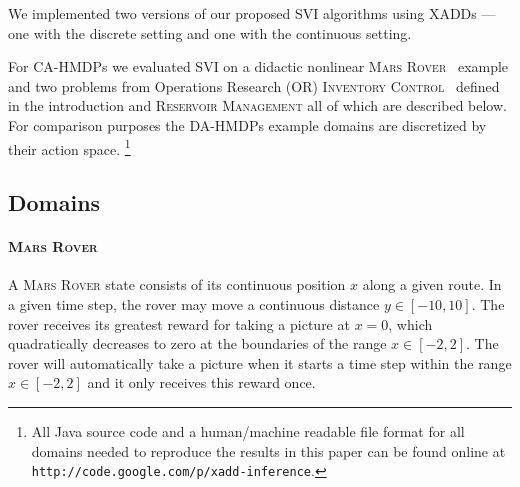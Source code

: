 \documentclass[twoside,11pt]{article}
\newcommand{\MarsRover}{\textsc{Mars Rover }}
\newcommand{\InventoryControl}{\textsc{Inventory Control }}
\newcommand{\WaterReservoir}{\textsc{Reservoir Management }}
\begin{document}
We implemented two versions of our proposed SVI algorithms using XADDs
--- one with the discrete setting and one with the continuous setting. 

For CA-HMDPs we evaluated SVI on a didactic nonlinear
\MarsRover\ example and two problems from Operations Research (OR) \InventoryControl\ defined in the introduction and \WaterReservoir  all of which are described below. For comparison purposes the DA-HMDPs example domains are discretized by their action space. \footnote{All Java source code and a human/machine readable file format for all domains needed to reproduce
the results in this paper can be found online at
\texttt{http://code.google.com/p/xadd-inference}.}

\subsection{Domains}

\paragraph{\MarsRover}
A \MarsRover state consists of its continuous position $x$ along a given route.  In a given time step, the rover may move a continuous distance $y \in [-10,10]$.  The rover receives its greatest reward for taking a picture at $x=0$, which quadratically decreases to zero at the boundaries of the range $x \in [-2,2]$.  The rover will
automatically take a picture when it starts a time step within the range $x \in [-2,2]$ and it only receives this reward once.
\end{document}
